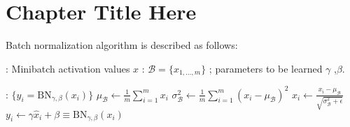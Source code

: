 
\chapter{Chapter Title Here} %

\label{ChapterX} %
Batch normalization algorithm is described as follows:



\vspace*{1.3\baselineskip}
\begin{algorithmic}[1]

\REQUIRE : Minibatch activation values $x$ : $\mathcal B = \{x_{1,\ldots,m}\}$ ; parameters to be learned $\gamma$ ,$\beta$.

\ENSURE  : $\{y_i = \mathrm{BN}_{\gamma,\beta}(x_i)\}$
\vspace*{.7\baselineskip}
\STATE $\mu_{\mathcal B} \leftarrow \frac1m \sum_{i = 1}^m x_i$
\vspace*{.7\baselineskip}
\STATE $\sigma^2_{\mathcal B} \leftarrow \frac1m \sum_{i=1}^m (x_i - \mu_{\mathcal B})^2$
\vspace*{.7\baselineskip}
\STATE $\hat x_i \leftarrow \frac{x_i - \mu_{\mathcal B}}{\sqrt{\sigma_{\mathcal B}^2 + \epsilon}}$
\vspace*{.7\baselineskip}
\STATE $y_i \leftarrow \gamma \hat x_i + \beta \equiv \mathrm{BN}_{\gamma,\beta}(x_i)$

\end{algorithmic}